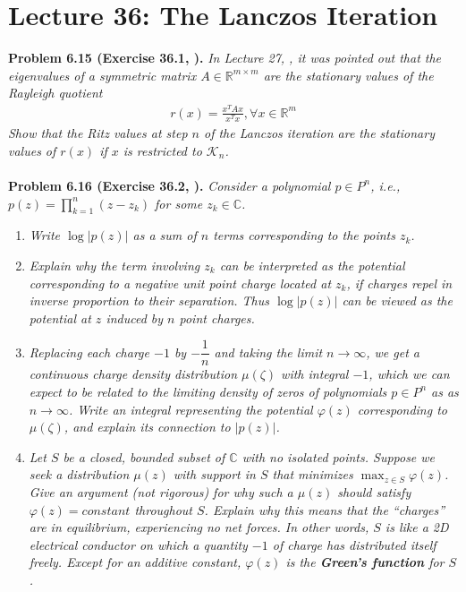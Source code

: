 \documentclass[a4paper,oneside]{book}
\numberwithin{equation}{chapter}
\begin{document}
\section{Lecture 36: The Lanczos Iteration}
\textbf{Problem 6.15 (Exercise 36.1, \cite{1}).} \textit{In Lecture 27, \cite{1}, it was pointed out that the eigenvalues of a symmetric matrix $A\in \mathbb{R}^{m\times m}$ are the stationary values of the Rayleigh quotient}
\begin{align}
r\left( x \right) = \frac{{{x^T}Ax}}{{{x^T}x}},\forall x \in {\mathbb{R}^m}
\end{align}
\textit{Show that the Ritz values at step $n$ of the Lanczos iteration are the stationary values of $r\left(x\right)$ if $x$ is restricted to $\mathcal{K}_n$.}\\
\\
\textbf{Problem 6.16 (Exercise 36.2, \cite{1}).} \textit{Consider a polynomial $p\in P^n$, i.e., $p\left( z \right) = \prod\limits_{k = 1}^n {\left( {z - {z_k}} \right)} $ for some $z_k \in \mathbb{C}$.}
\begin{enumerate}
\item \textit{Write $\log \left| {p\left( z \right)} \right|$ as a sum of $n$ terms corresponding to the points $z_k$.}
\item \textit{Explain why the term involving $z_k$ can be interpreted as the potential corresponding to a negative unit point charge located at $z_k$, if charges repel in inverse proportion to their separation. Thus $\log \left| {p\left( z \right)} \right|$ can be viewed as the potential at $z$ induced by $n$ point charges.}
\item \textit{Replacing each charge $-1$ by $-\dfrac{1}{n}$ and taking the limit $n\to \infty$, we get a continuous charge density distribution $\mu \left( \zeta  \right)$ with integral $-1$, which we can expect to be related to the limiting density of zeros of polynomials $p\in P^n$ as as $n\to \infty$. Write an integral representing the potential $\varphi \left(z\right)$ corresponding to $\mu \left( \zeta  \right)$, and explain its connection to $\left|p\left(z\right)\right|$.}
\item \textit{Let $S$ be a closed, bounded subset of $\mathbb{C}$ with no isolated points. Suppose we seek a distribution $\mu \left(z\right)$ with support in $S$ that minimizes ${\max _{z \in S}}\varphi \left( z \right)$. Give an argument (not rigorous) for why such a $\mu \left(z\right)$ should satisfy $\varphi \left(z\right) = constant$ throughout $S$. Explain why this means that the ``charges'' are in equilibrium, experiencing no net forces. In other words, $S$ is like a 2D electrical conductor on which a quantity $-1$ of charge has distributed itself freely. Except for an additive constant, $\varphi \left(z\right)$ is the \textbf{Green's function} for $S$.}
\end{enumerate}
\end{document}
